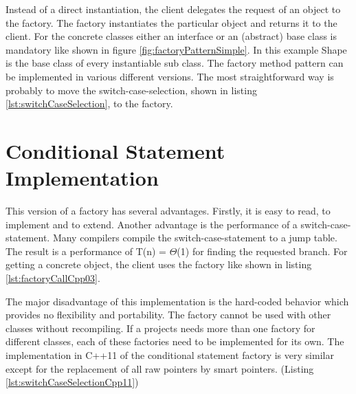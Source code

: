 {\noindent Instead of a direct instantiation, the client delegates the request of an object to the factory. The factory instantiates the particular object and returns it to the client. For the concrete classes either an interface or an (abstract) base class is mandatory like shown in figure \ref{fig:factoryPatternSimple}. In this example Shape is the base class of every instantiable sub class. The factory method pattern can be implemented in various different versions. The most straightforward way is probably to move the switch-case-selection, shown in listing \ref{lst:switchCaseSelection}, to the factory.

\newpage

\section{Conditional Statement Implementation}\label{sec:conditionalStatementFactory}



\noindent This version of a factory has several advantages. Firstly, it is easy to read, to implement and to extend. Another advantage is the performance of a switch-case-statement. Many compilers compile the switch-case-statement to a jump table. The result is a performance of T(n) = $\Theta$(1) for finding the requested branch. \cite[cf.][]{Ding2012} For getting a concrete object, the client uses the factory like shown in listing \ref{lst:factoryCallCpp03}.



\noindent The major disadvantage of this implementation is the hard-coded behavior which provides no flexibility and portability. The factory cannot be used with other classes without recompiling. If a projects needs more than one factory for different classes, each of these factories need to be implemented for its own. The implementation in C++11 of the conditional statement factory is very similar except for the replacement of all raw pointers by smart pointers. (Listing \ref{lst:switchCaseSelectionCpp11})

}
